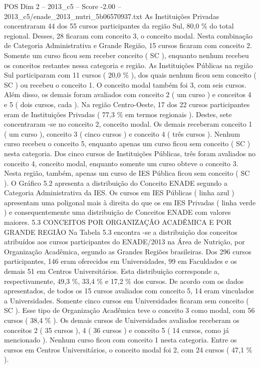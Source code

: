 \begin{textsample}{POS Dim 2 – 2013\_c5 – Score -2.00 – 2013\_c5/enade\_2013\_nutri\_5b06570937.txt}
As Instituições Privadas concentraram 44 dos 55 cursos participantes da região Sul, 80,0 \% do total regional.
Desses, 28 ficaram com conceito 3, o conceito modal.
Nesta combinação de Categoria Administrativa e Grande Região, 15 cursos ficaram com conceito 2.
Somente um curso ficou sem receber conceito ( SC ), enquanto nenhum recebeu os conceitos restantes nessa categoria e região.
As Instituições Públicas na região Sul participaram com 11 cursos ( 20,0 \% ), dos quais nenhum ficou sem conceito ( SC ) ou recebeu o conceito 1.
O conceito modal também foi 3, com seis cursos.
Além disso, os demais foram avaliados com conceito 2 ( um curso ) e conceitos 4 e 5 ( dois cursos, cada ).
Na região Centro-Oeste, 17 dos 22 cursos participantes eram de Instituições Privadas ( 77,3 \% em termos regionais ).
Destes, sete concentraram -se no conceito 2, conceito modal.
Os demais receberam conceito 1 ( um curso ), conceito 3 ( cinco cursos ) e conceito 4 ( três cursos ).
Nenhum curso recebeu o conceito 5, enquanto apenas um curso ficou sem conceito ( SC ) nesta categoria.
Dos cinco cursos de Instituições Públicas, três foram avaliados no conceito 4, conceito modal, enquanto somente um curso obteve o conceito 3.
Nesta região, também, apenas um curso de IES Pública ficou sem conceito ( SC ).
O Gráfico 5.2 apresenta a distribuição do Conceito ENADE segundo a Categoria Administrativa da IES.
Os cursos em IES Públicas ( linha azul ) apresentam uma poligonal mais à direita do que os em IES Privadas ( linha verde ) e consequentemente uma distribuição de Conceitos ENADE com valores maiores. 5.3 CONCEITOS POR ORGANIZAÇÃO ACADÊMICA E POR GRANDE REGIÃO Na Tabela 5.3 encontra -se a distribuição dos conceitos atribuídos aos cursos participantes do ENADE/2013 na Área de Nutrição, por Organização Acadêmica, segundo as Grandes Regiões brasileiras.
Dos 296 cursos participantes, 146 eram oferecidos em Universidades, 99 em Faculdades e os demais 51 em Centros Universitários.
Esta distribuição corresponde a, respectivamente, 49,3 \%, 33,4 \% e 17,2 \% dos cursos.
De acordo com os dados apresentados, de todos os 15 cursos avaliados com conceito 5, 14 eram vinculados a Universidades.
Somente cinco cursos em Universidades ficaram sem conceito ( SC ).
Esse tipo de Organização Acadêmica teve o conceito 3 como modal, com 56 cursos ( 38,4 \% ).
Os demais cursos de Universidades avaliados receberam os conceitos 2 ( 35 cursos ), 4 ( 36 cursos ) e conceito 5 ( 14 cursos, como já mencionado ).
Nenhum curso ficou com conceito 1 nesta categoria.
Entre os cursos em Centros Universitários, o conceito modal foi 2, com 24 cursos ( 47,1 \% ).

\end{textsample}

